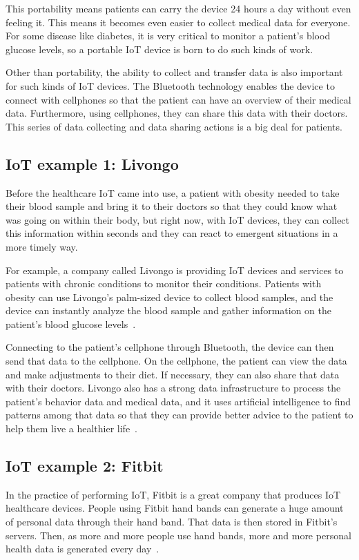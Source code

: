 This portability means patients can carry the device 24 
hours a day without even 
feeling it. This means it becomes even easier to collect medical data for 
everyone. For some disease like diabetes, it is very critical to monitor a 
patient's blood glucose levels, so a portable IoT device is born to do such 
kinds of work. 

Other than portability, the ability to collect and transfer data is also 
important for such kinds of IoT devices. The Bluetooth technology 
enables the device to connect with cellphones so that the patient can 
have an overview of their medical data. Furthermore, using cellphones, they 
can share this data with their doctors. This series of data collecting 
and data sharing actions is a big deal for patients. 

\subsection{IoT example 1: Livongo}
Before the healthcare IoT came into use, a patient with obesity needed to 
take their blood sample and 
bring it to their doctors so that they could know what was going on within 
their body, but right now, with IoT devices, they can collect this
information within seconds and they can react to emergent situations 
in a more timely way. 

For example, a company called Livongo is providing IoT devices and 
services to patients with chronic conditions to monitor their conditions. 
Patients with obesity can use Livongo's palm-sized device to collect 
blood samples, and the device can instantly analyze the blood sample 
and gather information on the patient's blood glucose levels~\cite{iotL}. 

Connecting to the patient's cellphone through Bluetooth, the device can 
then send that data to the cellphone. On the cellphone, the patient 
can view the data and make adjustments to their diet. If necessary, 
they can also share that data with their doctors. Livongo also has a 
strong data infrastructure to process the patient's behavior data and 
medical data, and it uses artificial intelligence to find patterns among
that data so that they can provide better advice to the patient to help 
them live a healthier life~\cite{iotL}.

\subsection{IoT example 2: Fitbit}
In the practice of performing IoT, Fitbit is a great company that produces 
IoT healthcare devices. People using Fitbit hand bands can generate a 
huge amount of personal data through their hand band. That data is
then stored in Fitbit’s servers. Then, as more and more people use hand 
bands, more and more personal health data is generated 
every day~\cite{fitbit}. 

